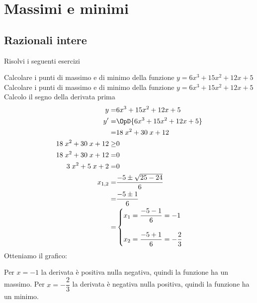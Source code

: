 \chapter{Massimi e minimi}
\section{Razionali intere}
Risolvi i seguenti esercizi
\tcbstartrecording


\begin{exercise}
Calcolare i punti di massimo e di minimo della funzione $y=6x^3+15x^2+12x+5$
	\tcblower
Calcolare i punti di massimo e di minimo della funzione $y=6x^3+15x^2+12x+5$
Calcolo il segno della derivata prima
\begin{align*}
y=&6x^3+15x^2+12x+5\\
y'=&\OpD{6x^3+15x^2+12x+5}\\
=&18 \; x^{2} + 30 \; x + 12\\
18 \; x^{2} + 30 \; x + 12\geq&0\\
18 \; x^{2} + 30 \; x + 12=&0\\
3 \; x^{2} + 5 \; x + 2=&0\\
x_{1,2}=&\dfrac{-5\pm\sqrt{25-24}}{6}\\
=&\dfrac{-5\pm 1}{6}\\
=&\begin{cases}
x_1=\dfrac{-5-1}{6}=-1\\
\\
x_2=\dfrac{-5+1}{6}=-\dfrac{2}{3}\\
\end{cases}
\end{align*}
	Otteniamo il grafico:
\begin{center}
	
\end{center}
Per $x=-1$ la derivata è positiva nulla negativa, quindi la funzione ha un massimo. Per $x=-\dfrac{2}{3}$ la derivata è negativa nulla positiva, quindi la funzione ha un minimo. 
\end{exercise}
\tcbstoprecording
\newpage
